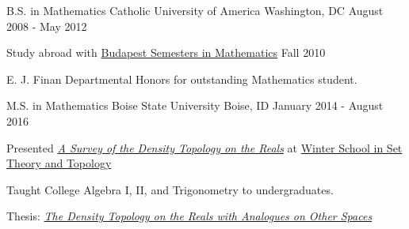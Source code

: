 

\begin{cventries}

  \cventry
    {B.S. in Mathematics} %
    {Catholic University of America} %
    {Washington, DC} %
    {August 2008 - May 2012} %
    {
      \begin{cvitems} %
        \item {Study abroad with \href{https://www.budapestsemesters.com/}{Budapest Semesters in Mathematics} Fall 2010}
        \item {E. J. Finan Departmental Honors for outstanding Mathematics student.}
      \end{cvitems}
    }
  \cventry
    {M.S. in Mathematics} %
    {Boise State University} %
    {Boise, ID} %
    {January 2014 - August 2016} %
    {
      \begin{cvitems} %
        \item {Presented {\sl \href{https://www.winterschool.eu/files/755-A_Survey_of_the_Density_Topology_on_the_Reals1052963613.pdf}{A Survey of the Density Topology on the Reals}} at \href{https://www.winterschool.eu/2015/program}{Winter School in Set Theory and Topology}}
        \item {Taught College Algebra I, II, and Trigonometry to undergraduates.}
        \item {Thesis: {\sl \href{https://scholarworks.boisestate.edu/td/1143/}{The Density Topology on the Reals with Analogues on Other Spaces}}}
      \end{cvitems}
    }

\end{cventries}
